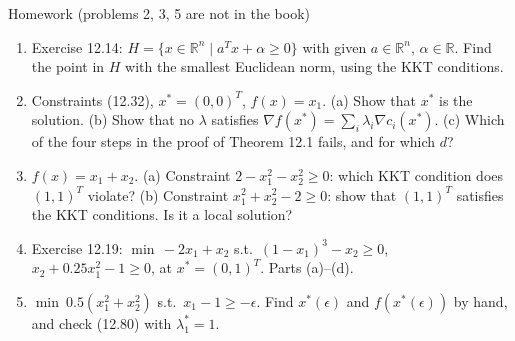 \documentclass[aspectratio=169,12pt]{beamer}
\newcommand{\R}{\mathbb{R}}
\newcommand{\xs}{x^{*}}
\newcommand{\gradf}{\nabla f}
\newcommand{\ls}{\lambda^{*}}
\begin{document}
\begin{frame}{Homework {\normalfont\small(problems 2, 3, 5 are not in the book)}}
  \begin{enumerate}\setlength\itemsep{0.35em}
    \item Exercise 12.14: $H=\{x\in\R^{n}\mid a^{T}x+\alpha\ge 0\}$ with given $a\in\R^{n}$, $\alpha\in\R$.
      Find the point in $H$ with the smallest Euclidean norm, using the KKT conditions.
    \item Constraints (12.32), $\xs=(0,0)^{T}$, $f(x)=x_{1}$. (a) Show that $\xs$ is the solution.
      (b) Show that no $\lambda$ satisfies $\gradf(\xs)=\sum_{i}\lambda_{i}\nabla c_{i}(\xs)$. (c) Which of the four steps in the proof of
      Theorem 12.1 fails, and for which $d$?
    \item $f(x)=x_{1}+x_{2}$. (a) Constraint $2-x_{1}^{2}-x_{2}^{2}\ge 0$: which KKT condition does
      $(1,1)^{T}$ violate? (b) Constraint $x_{1}^{2}+x_{2}^{2}-2\ge 0$: show that $(1,1)^{T}$ satisfies the KKT
      conditions. Is it a local solution?
    \item Exercise 12.19: $\min\,-2x_{1}+x_{2}$ s.t.\ $(1-x_{1})^{3}-x_{2}\ge 0$,
      $x_{2}+0.25x_{1}^{2}-1\ge 0$, at $\xs=(0,1)^{T}$. Parts (a)--(d).
    \item $\min\ 0.5(x_{1}^{2}+x_{2}^{2})$ s.t.\ $x_{1}-1\ge-\epsilon$. Find $\xs(\epsilon)$ and
      $f(\xs(\epsilon))$ by hand, and check (12.80) with $\ls_{1}=1$.
  \end{enumerate}
\end{frame}
\end{document}
